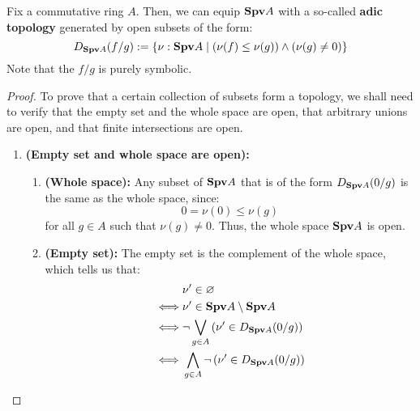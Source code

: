                 \begin{proposition} \label{prop: the_adic_topology}
                    Fix a commutative ring $A$. Then, we can equip $\Spv A$ with a so-called \textbf{adic topology} generated by open subsets of the form:
                        $$D_{\Spv A}(f/g) := \{\nu: \Spv A \mid \left(\nu(f) \leq \nu(g)\right) \wedge (\nu(g) \not = 0)\}$$
                    Note that the  $f/g$ is purely symbolic.
                \end{proposition}
                    \begin{proof}
                        To prove that a certain collection of subsets form a topology, we shall need to verify that the empty set and the whole space are open, that arbitrary unions are open, and that finite intersections are open.
                            \begin{enumerate}
                                \item \textbf{(Empty set and whole space are open):} 
                                    \begin{enumerate}
                                        \item \textbf{(Whole space):} Any subset of $\Spv A$ that is of the form $D_{\Spv A}(0/g)$ is the same as the whole space, since:
                                            $$0 = \nu(0) \leq \nu(g)$$
                                        for all $g \in A$ such that $\nu(g) \not = 0$. Thus, the whole space $\Spv A$ is open. 
                                        \item \textbf{(Empty set):} The empty set is the complement of the whole space, which tells us that:
                                            $$
                                                \begin{aligned}
                                                    & \nu' \in \varnothing 
                                                    \\
                                                    \iff & \nu' \in \Spv A \setminus \Spv A
                                                    \\
                                                    \iff & \neg \bigvee_{g \in A} \left(\nu' \in D_{\Spv A}(0/g)\right)
                                                    \\
                                                    \iff & \bigwedge_{g \in A} \neg \left(\nu' \in D_{\Spv A}(0/g)\right)

\end{aligned}$$
\end{enumerate}
\end{enumerate}
\end{proof}
